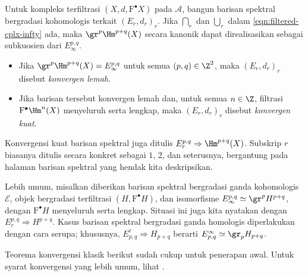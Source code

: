 \begin{definition}\label{def:filtered-cplx-convergence}
	Untuk kompleks terfiltrasi $(X,d,\mathrm{F}^\bullet X)$ pada $\mathcal{A}$,
	bangun barisan spektral bergradasi kohomologis terkait $(E_r,d_r)_r$. Jika
	$\bigcap_r$ dan $\bigcup_r$ dalam \eqref{eqn:filtered-cplx-infty} ada, maka
	$\gr^p\Hm^{p+q}(X)$ secara kanonik dapat direalisasikan sebagai subkuosien
	dari $E_\infty^{p,q}$.
	\begin{itemize}
		\item Jika $\gr^p\Hm^{p+q}(X)=E_\infty^{p,q}$ untuk semua
		$(p,q)\in\Z^2$, maka $(E_r,d_r)_r$ disebut \emph{konvergen lemah}.
		\item Jika barisan tersebut konvergen lemah dan, untuk semua $n\in\Z$,
		filtrasi $\mathrm{F}^\bullet\Hm^n(X)$ menyeluruh serta lengkap, maka
		$(E_r,d_r)_r$ disebut \emph{konvergen kuat}.
	\end{itemize}
\end{definition}

\begin{convention}\label{con:ss-conv}
	Konvergensi kuat barisan spektral juga ditulis
	$E_r^{p,q}\Rightarrow\Hm^{p+q}(X)$. Subskrip $r$ biasanya ditulis secara
	konkret sebagai $1$, $2$, dan seterusnya, bergantung pada halaman barisan
	spektral yang hendak kita deskripsikan.

	Lebih umum, misalkan diberikan barisan spektral bergradasi ganda
	kohomologis $\mathscr{E}$, objek bergradasi terfiltrasi
	$(H,\mathrm{F}^\bullet H)$, dan isomorfisme
	$E_\infty^{p,q}\simeq\gr^pH^{p+q}$, dengan
	$\mathrm{F}^\bullet H$ menyeluruh serta lengkap. Situasi ini juga kita
	nyatakan dengan $E_r^{p,q}\Rightarrow H^{p+q}$. Kasus barisan spektral
	bergradasi ganda homologis diperlakukan dengan cara serupa; khususnya,
	$E^r_{p,q}\Rightarrow H_{p+q}$ berarti
	$E^\infty_{p,q}\simeq\gr_pH_{p+q}$.
\end{convention}

Teorema konvergensi klasik berikut sudah cukup untuk penerapan awal. Untuk
syarat konvergensi yang lebih umum, lihat \cite{Boa99}.


